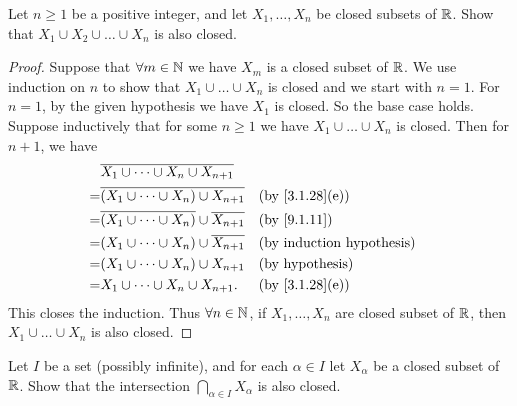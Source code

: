 \begin{ex}\label{ex:9.1.7}
  Let \(n \geq 1\) be a positive integer, and let \(X_1, \dots, X_n\) be closed subsets of \(\mathbb{R}\).
  Show that \(X_1 \cup X_2 \cup \dots \cup X_n\) is also closed.
\end{ex}

\begin{proof}
  Suppose that \(\forall m \in \mathbb{N}\) we have \(X_m\) is a closed subset of \(\mathbb{R}\).
  We use induction on \(n\) to show that \(X_1 \cup \dots \cup X_n\) is closed and we start with \(n = 1\).
  For \(n = 1\), by the given hypothesis we have \(X_1\) is closed.
  So the base case holds.
  Suppose inductively that for some \(n \geq 1\) we have \(X_1 \cup \dots \cup X_n\) is closed.
  Then for \(n + 1\), we have
  \begin{align*}
      & \overline{X_1 \cup \dots \cup X_n \cup X_{n + 1}}                                                    \\
    = & \overline{(X_1 \cup \dots \cup X_n) \cup X_{n + 1}}            &  & \text{(by \cref{3.1.28}(e))}     \\
    = & \overline{(X_1 \cup \dots \cup X_n)} \cup \overline{X_{n + 1}} &  & \text{(by \cref{9.1.11})}        \\
    = & (X_1 \cup \dots \cup X_n) \cup \overline{X_{n + 1}}            &  & \text{(by induction hypothesis)} \\
    = & (X_1 \cup \dots \cup X_n) \cup X_{n + 1}                       &  & \text{(by hypothesis)}           \\
    = & X_1 \cup \dots \cup X_n \cup X_{n + 1}.                        &  & \text{(by \cref{3.1.28}(e))}
  \end{align*}
  This closes the induction.
  Thus \(\forall n \in \mathbb{N}\), if \(X_1, \dots, X_n\) are closed subset of \(\mathbb{R}\), then \(X_1 \cup \dots \cup X_n\) is also closed.
\end{proof}

\begin{ex}\label{ex:9.1.8}
  Let \(I\) be a set (possibly infinite), and for each \(\alpha \in I\) let \(X_{\alpha}\) be a closed subset of \(\mathbb{R}\).
  Show that the intersection \(\bigcap_{\alpha \in I} X_{\alpha}\) is also closed.
\end{ex}

